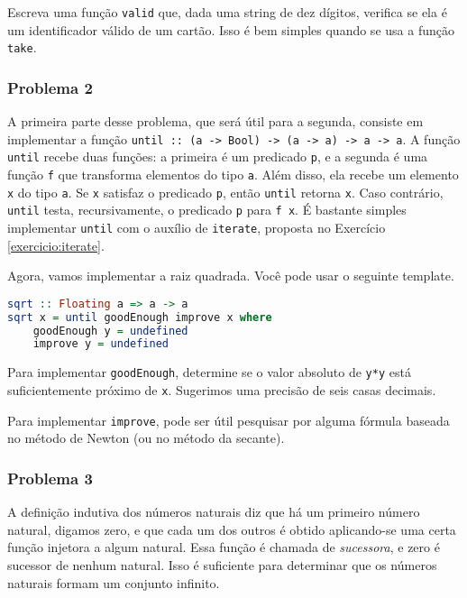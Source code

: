 \documentclass[a4paper]{article}
\begin{document}
Escreva uma função \texttt{valid} que, dada uma string de dez dígitos, verifica se ela é um identificador válido de um cartão.
Isso é bem simples quando se usa a função \texttt{take}.

\subsubsection{Problema 2}

A primeira parte desse problema, que será útil para a segunda, consiste em implementar a função \texttt{until :: (a -> Bool) -> (a -> a) -> a -> a}.
A função \texttt{until} recebe duas funções: a primeira é um predicado \texttt{p}, e a segunda é uma função \texttt{f} que transforma elementos do tipo \texttt{a}.
Além disso, ela recebe um elemento \texttt{x} do tipo \texttt{a}.
Se \texttt{x} satisfaz o predicado \texttt{p}, então \texttt{until} retorna \texttt{x}.
Caso contrário, \texttt{until} testa, recursivamente, o predicado \texttt{p} para \texttt{f x}.
É bastante simples implementar \texttt{until} com o auxílio de \texttt{iterate}, proposta no Exercício \ref{exercicio:iterate}.

Agora, vamos implementar a raiz quadrada.
Você pode usar o seguinte template.

\begin{lstlisting}[language=haskell, frame=single]
sqrt :: Floating a => a -> a
sqrt x = until goodEnough improve x where
	goodEnough y = undefined
	improve y = undefined
\end{lstlisting}

Para implementar \texttt{goodEnough}, determine se o valor absoluto de \texttt{y*y} está suficientemente próximo de \texttt{x}.
Sugerimos uma precisão de seis casas decimais.

Para implementar \texttt{improve}, pode ser útil pesquisar por alguma fórmula baseada no método de Newton (ou no método da secante).

\subsubsection{Problema 3}

A definição indutiva dos números naturais diz que há um primeiro número natural, digamos zero, e que cada um dos outros é obtido aplicando-se uma certa função injetora a algum natural.
Essa função é chamada de \emph{sucessora}, e zero é sucessor de nenhum natural.
Isso é suficiente para determinar que os números naturais formam um conjunto infinito.
\end{document}

